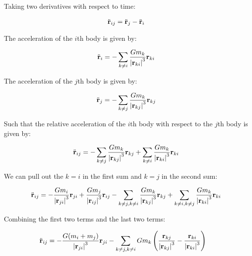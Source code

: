 Taking two derivatives with respect to time:

\begin{align*}
    \ddot{\mathbf{r}}_{ij} &= \ddot{\mathbf{r}}_j - \ddot{\mathbf{r}}_i \\
\end{align*}

The acceleration of the $i$th body is given by:

\begin{align*}
    \ddot{\mathbf{r}}_i &= - \sum_{k\neq i} \frac{G m_k}{\left| \mathbf{r}_{ki} \right|^3} \mathbf{r}_{ki} \\
\end{align*}

The acceleration of the $j$th body is given by:

\begin{align*}
    \ddot{\mathbf{r}}_j &= -\sum_{k\neq j} \frac{G m_k}{\left| \mathbf{r}_{kj} \right|^3} \mathbf{r}_{kj} \\
\end{align*}

Such that the relative acceleration of the $i$th body with respect to the $j$th body is given by:

\begin{align*}
    \ddot{\mathbf{r}}_{ij} &= -\sum_{k\neq j} \frac{G m_k}{\left| \mathbf{r}_{kj} \right|^3} \mathbf{r}_{kj} + \sum_{k\neq i} \frac{G m_k}{\left| \mathbf{r}_{ki} \right|^3} \mathbf{r}_{ki} \\
\end{align*}

We can pull out the $k=i$ in the first sum and $k=j$ in the second sum:

\begin{align*}
    \ddot{\mathbf{r}}_{ij} &= -\frac{G m_i}{\left| \mathbf{r}_{ji} \right|^3} \mathbf{r}_{ji} + \frac{G m_j}{\left| \mathbf{r}_{ij} \right|^3} \mathbf{r}_{ij} -\sum_{k\neq j, k\neq i} \frac{G m_k}{\left| \mathbf{r}_{kj} \right|^3} \mathbf{r}_{kj} + \sum_{k\neq i, k\neq j} \frac{G m_k}{\left| \mathbf{r}_{ki} \right|^3} \mathbf{r}_{ki} \\
\end{align*}

Combining the first two terms and the last two terms:

\begin{align*}
    \ddot{\mathbf{r}}_{ij} &= -\frac{G (m_i + m_j)}{\left| \mathbf{r}_{ji} \right|^3} \mathbf{r}_{ji} - \sum_{k\neq j, k\neq i} G m_k \left(\frac{\mathbf{r}_{kj}}{{\left| \mathbf{r}_{kj} \right|^3}} - \frac{\mathbf{r}_{ki}}{{\left| \mathbf{r}_{ki} \right|^3}}\right)
\end{align*}

